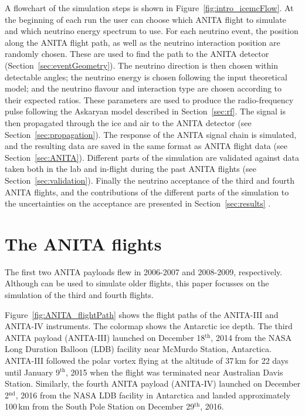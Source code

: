 A flowchart of the \icemc simulation steps is shown in Figure~\ref{fig:intro_icemcFlow}.
At the beginning of each run the user can choose which ANITA flight to simulate and which neutrino energy spectrum to use.
For each neutrino event, the position along the ANITA flight path, as well as the neutrino interaction position are randomly chosen.
These are used to find the path to the ANITA detector (Section~\ref{sec:eventGeometry}). %
The neutrino direction is then chosen within detectable angles; the neutrino energy is chosen following the input theoretical model; and the neutrino flavour and interaction type are chosen according to their expected ratios. 
These parameters are used to produce the radio-frequency pulse following the Askaryan model described in Section~\ref{sec:rf}.
The signal is then propagated through the ice and air to the ANITA
detector (see Section~\ref{sec:propagation}). 
The response of the ANITA signal chain is simulated, and the resulting 
data are saved in the same format as ANITA flight data 
(see Section~\ref{sec:ANITA}).
Different parts of the simulation are validated against data taken both in
the lab and in-flight during the past ANITA flights (see
Section~\ref{sec:validation}).
Finally the neutrino acceptance of the third and fourth ANITA flights, and
the contributions of the different parts of the simulation to the uncertainties on the acceptance are presented in Section~\ref{sec:results} .



\section{The ANITA flights}
\label{sec:anita3}
The first two ANITA payloads flew in 2006-2007\cite{ANITA1paper} and 2008-2009\cite{ANITA2paper,ANITA2erratum}, respectively.
Although \icemc can be used to simulate older flights, this paper focusses on the simulation of the third and fourth flights.

Figure~\ref{fig:ANITA_flightPath} shows the flight paths of the ANITA-III and ANITA-IV instruments. 
The colormap shows the Antarctic ice depth. 
The third ANITA payload (ANITA-III) launched on December 18$^{\text{th}}$, 2014 from the
NASA Long Duration Balloon (LDB) facility near McMurdo Station, Antarctica.
ANITA-III followed the polar vortex flying at the altitude of 37\,km for
22 days until January 9$^{\text{th}}$, 2015 when the flight was terminated
near Australian Davis Station.
Similarly, the fourth ANITA payload (ANITA-IV) launched on December 2$^{\text{nd}}$, 2016 from the NASA LDB facility in Antarctica and landed approximately 100\,km from the South Pole Station on December 29$^{\text{th}}$, 2016.


